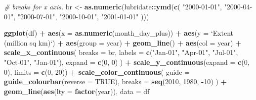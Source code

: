 \documentclass[]{book}
\newenvironment{Shaded}{\begin{snugshade}}{\end{snugshade}}
\newcommand{\KeywordTok}[1]{\textcolor[rgb]{0.13,0.29,0.53}{\textbf{#1}}}
\newcommand{\DataTypeTok}[1]{\textcolor[rgb]{0.13,0.29,0.53}{#1}}
\newcommand{\DecValTok}[1]{\textcolor[rgb]{0.00,0.00,0.81}{#1}}
\newcommand{\StringTok}[1]{\textcolor[rgb]{0.31,0.60,0.02}{#1}}
\newcommand{\CommentTok}[1]{\textcolor[rgb]{0.56,0.35,0.01}{\textit{#1}}}
\newcommand{\OtherTok}[1]{\textcolor[rgb]{0.56,0.35,0.01}{#1}}
\newcommand{\OperatorTok}[1]{\textcolor[rgb]{0.81,0.36,0.00}{\textbf{#1}}}
\newcommand{\NormalTok}[1]{#1}
\theoremstyle{definition}
\theoremstyle{definition}
\theoremstyle{definition}
\theoremstyle{remark}
\begin{document}
\begin{Shaded}
\begin{Highlighting}[]
\CommentTok{# breaks for x axis.}
\NormalTok{br <-}\StringTok{ }\KeywordTok{as.numeric}\NormalTok{(lubridate}\OperatorTok{::}\KeywordTok{ymd}\NormalTok{(}\KeywordTok{c}\NormalTok{(}
  \StringTok{"2000-01-01"}\NormalTok{, }\StringTok{"2000-04-01"}\NormalTok{,}
  \StringTok{"2000-07-01"}\NormalTok{, }\StringTok{"2000-10-01"}\NormalTok{, }\StringTok{"2001-01-01"}
\NormalTok{)))}

\KeywordTok{ggplot}\NormalTok{(df) }\OperatorTok{+}
\StringTok{  }\KeywordTok{aes}\NormalTok{(}\DataTypeTok{x =} \KeywordTok{as.numeric}\NormalTok{(month_day_plus)) }\OperatorTok{+}
\StringTok{  }\KeywordTok{aes}\NormalTok{(}\DataTypeTok{y =} \StringTok{`}\DataTypeTok{Extent (million sq km)}\StringTok{`}\NormalTok{) }\OperatorTok{+}
\StringTok{  }\KeywordTok{aes}\NormalTok{(}\DataTypeTok{group =}\NormalTok{ year) }\OperatorTok{+}
\StringTok{  }\KeywordTok{geom_line}\NormalTok{() }\OperatorTok{+}
\StringTok{  }\KeywordTok{aes}\NormalTok{(}\DataTypeTok{col =}\NormalTok{ year) }\OperatorTok{+}
\StringTok{  }\KeywordTok{scale_x_continuous}\NormalTok{(}
    \DataTypeTok{breaks =}\NormalTok{ br,}
    \DataTypeTok{labels =} \KeywordTok{c}\NormalTok{(}\StringTok{"Jan-01"}\NormalTok{, }\StringTok{"Apr-01"}\NormalTok{, }\StringTok{"Jul-01"}\NormalTok{, }\StringTok{"Oct-01"}\NormalTok{, }\StringTok{"Jan-01"}\NormalTok{), }
    \DataTypeTok{expand =} \KeywordTok{c}\NormalTok{(}\DecValTok{0}\NormalTok{, }\DecValTok{0}\NormalTok{)}
\NormalTok{  ) }\OperatorTok{+}
\StringTok{  }\KeywordTok{scale_y_continuous}\NormalTok{(}\DataTypeTok{expand =} \KeywordTok{c}\NormalTok{(}\DecValTok{0}\NormalTok{, }\DecValTok{0}\NormalTok{), }\DataTypeTok{limits =} \KeywordTok{c}\NormalTok{(}\DecValTok{0}\NormalTok{, }\DecValTok{20}\NormalTok{)) }\OperatorTok{+}
\StringTok{  }\KeywordTok{scale_color_continuous}\NormalTok{(}
    \DataTypeTok{guide =} \KeywordTok{guide_colourbar}\NormalTok{(}\DataTypeTok{reverse =} \OtherTok{TRUE}\NormalTok{),}
    \DataTypeTok{breaks =} \KeywordTok{seq}\NormalTok{(}\DecValTok{2010}\NormalTok{, }\DecValTok{1980}\NormalTok{, }\OperatorTok{-}\DecValTok{10}\NormalTok{)}
\NormalTok{  ) }\OperatorTok{+}
\StringTok{  }\KeywordTok{geom_line}\NormalTok{(}\KeywordTok{aes}\NormalTok{(}\DataTypeTok{lty =} \KeywordTok{factor}\NormalTok{(year)),}
    \DataTypeTok{data =}\NormalTok{ df }\OperatorTok{%>%}\StringTok{ }\KeywordTok{filter}\NormalTok{(year }\OperatorTok{==}\StringTok{ }\DecValTok{2016} \OperatorTok{|}\StringTok{ }\NormalTok{year }\OperatorTok{==}\StringTok{ }\DecValTok{1982}\NormalTok{),}
}
\end{Highlighting}
\end{Shaded}
\end{document}
